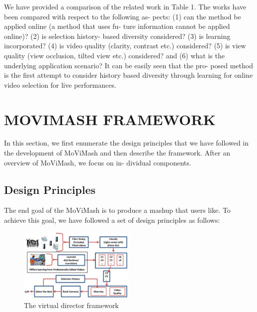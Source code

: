 \documentclass{new}
\begin{document}
We have provided a comparison of the related work in Table 1.
The works have been compared with respect to the following as-
pects: (1) can the method be applied online (a method that uses fu-
ture information cannot be applied online)? (2) is selection history-
based diversity considered? (3) is learning incorporated? (4) is
video quality (clarity, contrast etc.) considered? (5) is view quality
(view occlusion, tilted view etc.) considered? and (6) what is the
underlying application scenario? It can be easily seen that the pro-
posed method is the first attempt to consider history based diversity
through learning for online video selection for live performances.

\section{MOVIMASH FRAMEWORK}
In this section, we first enumerate the design principles that we
have followed in the development of MoViMash and then describe
the framework. After an overview of MoViMash, we focus on in-
dividual components.



\subsection{Design Principles}
The end goal of the MoViMash is to produce a mashup that users
like. To achieve this goal, we have followed a set of design principles as follows:

\begin{figure}
    \centering
    \includegraphics[width=0.5\textwidth]{img2.png}
    \caption{The virtual director framework}
    \label{fig:2}
\end{figure}
\end{document}
